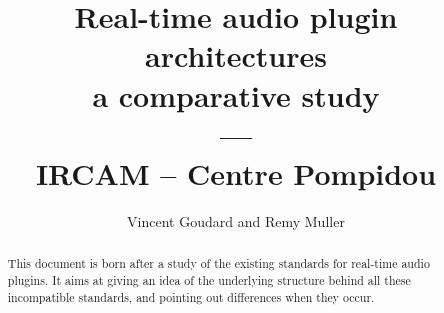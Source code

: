 \documentclass[12pt,a4paper]{report}
\title{\textbf{Real-time audio plugin architectures}\\
\large a comparative study\\
---\\
IRCAM -- Centre Pompidou \\}
\author{Vincent Goudard and Remy Muller}
\newif\ifpdf
\begin{document}
\ifpdf
\DeclareGraphicsExtensions{.pdf, .jpg, .tif}
\else
{}
\fi

\maketitle

\cleardoublepage
\begin{abstract}
\noindent This document is born after a study of the existing standards for real-time audio plugins. It aims at giving an idea of the underlying structure behind all these incompatible standards, and pointing out differences when they occur.
\end{abstract}


\cleardoublepage

\tableofcontents









%
%
\end{document}
